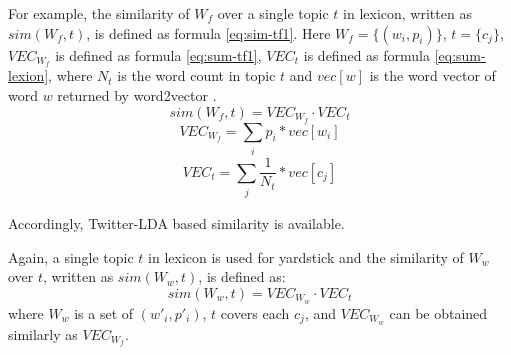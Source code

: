 For example, the similarity of $W_f$ over a single topic $t$ in lexicon, written as $sim(W_f, t)$, is defined as formula \ref{eq:sim-tf1}. Here $W_f = \{(w_i, p_i)\}$, $t = \{c_j\}$, $VEC_{W_f}$ is defined as formula \ref{eq:sum-tf1}, $VEC_t$ is defined as formula \ref{eq:sum-lexion}, where $N_t$ is the word count in topic $t$ and $vec[w]$ is the word vector of word $w$ returned by word2vector \cite{IEEEexample:mikolov2013distributed}.
\begin{equation}
\label{eq:sim-tf1}
sim(W_f, t) = VEC_{W_f} \cdot VEC_t
\end{equation}
\begin{equation}
\label{eq:sum-tf1}
VEC_{W_f} = \sum_{\substack{i}} p_i*vec[w_i]
\end{equation}
\begin{equation}
\label{eq:sum-lexion}
VEC_t = \sum_{\substack{j}} \frac{1}{N_t}*vec[c_j]
\end{equation}



\begin{comment}
:
\begin{equation}
\label{eq:sim-tf2}
sim(w_i, t) = \sum_{\substack{j}} sim(w_i, c_j)
\end{equation}
\end{comment}

 Accordingly, Twitter-LDA based similarity is available.

Again, a single topic $t$ in lexicon is used for yardstick and the similarity of $W_w$ over $t$, written as $sim(W_w, t)$, is defined as:
\begin{equation}
\label{eq:sim-tw1}
sim(W_w, t) = VEC_{W_w} \cdot VEC_t
\end{equation}
where $W_w$ is a set of $(w'_i, p'_i)$, $t$ covers each $c_j$, and $VEC_{W_w}$ can be obtained similarly as $VEC_{W_f}$.

